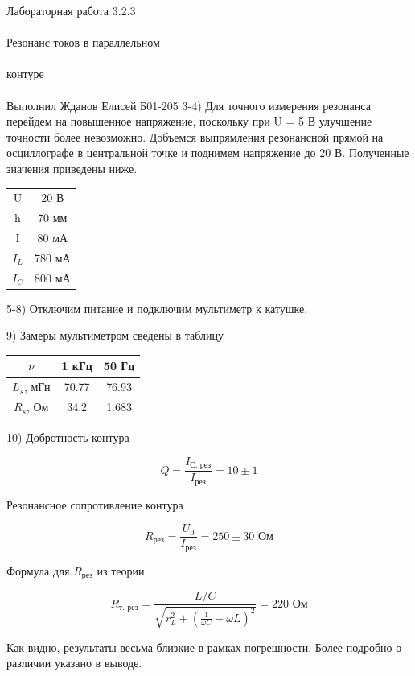 \documentclass{astroedu-lab}
\begin{document}
\begin{problem}{\huge Лабораторная работа 3.2.3\\\\Резонанс токов в параллельном\\\\контуре\\\\Выполнил Жданов Елисей Б01-205}
3-4) Для точного измерения резонанса перейдем на повышенное напряжение, поскольку при U = 5 В улучшение точности более невозможно. Добъемся выпрямления резонансной прямой на осциллографе в центральной точке и поднимем напряжение до 20 В. Полученные значения приведены ниже.

\begin{center}
\begin{tabular}{|c|c|}
\hline 
U & 20		В  \\
h & 70		мм \\
I & 80		мА \\
$I_L$ & 780	мА \\
$I_C$ & 800	мА \\
\hline
\end{tabular}
\end{center}

5-8) Отключим питание и подключим мультиметр к катушке.

9) Замеры мультиметром сведены в таблицу

\begin{center}
\begin{tabular}{|c|c|c|}
\hline 
$\nu$ 		& 1 кГц & 50 Гц \\
\hline 
$L_s$, мГн	& 70.77 & 76.93	\\
$R_s$, Ом	& 34.2	& 1.683	\\
\hline
\end{tabular}
\end{center}

10) Добротность контура

\begin{equation}
	Q = \frac{I_\text{С, рез}}{I_\text{рез}} = 10 \pm 1
\end{equation}

Резонансное сопротивление контура

\begin{equation}
	R_\text{рез} = \frac{U_0}{I_\text{рез}} = 250 \pm 30 \text{ Ом}
\end{equation}

Формула для $R_\text{рез}$ из теории

\begin{equation}
	R_\text{т. рез} = \frac{L / C}{\sqrt{r_L^2 + \left( \frac{1}{\omega C} - \omega L \right)^2}} = 220 \text{ Ом}
\end{equation}

Как видно, результаты весьма близкие в рамках погрешности. Более подробно о различии указано в выводе.


\end{problem}
\end{document}
